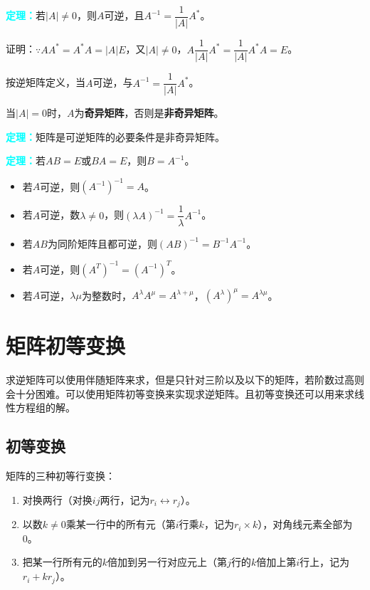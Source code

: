 \documentclass[UTF8, 12pt]{ctexart}
\begin{document}
\textcolor{aqua}{\textbf{定理：}}若$\vert A\vert\neq 0$，则$A$可逆，且$A^{-1}=\dfrac{1}{\vert A\vert}A^*$。

证明：$\because AA^*=A^*A=\vert A\vert E$，又$\vert A\vert\neq 0$，$A\dfrac{1}{\vert A\vert}A^*=\dfrac{1}{\vert A\vert}A^*A=E$。

按逆矩阵定义，当$A$可逆，与$A^{-1}=\dfrac{1}{\vert A\vert}A^*$。

当$\vert A\vert=0$时，$A$为\textbf{奇异矩阵}，否则是\textbf{非奇异矩阵}。

\textcolor{aqua}{\textbf{定理：}}矩阵是可逆矩阵的必要条件是非奇异矩阵。

\textcolor{aqua}{\textbf{定理：}}若$AB=E$或$BA=E$，则$B=A^{-1}$。

\begin{itemize}
    \item 若$A$可逆，则$(A^{-1})^{-1}=A$。
    \item 若$A$可逆，数$\lambda\neq0$，则$(\lambda A)^{-1}=\dfrac{1}{\lambda}A^{-1}$。
    \item 若$AB$为同阶矩阵且都可逆，则$(AB)^{-1}=B^{-1}A^{-1}$。
    \item 若$A$可逆，则$(A^T)^{-1}=(A^{-1})^T$。
    \item 若$A$可逆，$\lambda\mu$为整数时，$A^\lambda A^\mu=A^{\lambda+\mu}$，$(A^\lambda)^\mu=A^{\lambda\mu}$。
\end{itemize}

\section{矩阵初等变换}

求逆矩阵可以使用伴随矩阵来求，但是只针对三阶以及以下的矩阵，若阶数过高则会十分困难。可以使用矩阵初等变换来实现求逆矩阵。且初等变换还可以用来求线性方程组的解。

\subsection{初等变换}

矩阵的三种初等行变换：

\begin{enumerate}
    \item 对换两行（对换$ij$两行，记为$r_i\leftrightarrow r_j$）。
    \item 以数$k\neq0$乘某一行中的所有元（第$i$行乘$k$，记为$r_i\times k$），对角线元素全部为0。
    \item 把某一行所有元的$k$倍加到另一行对应元上（第$j$行的$k$倍加上第$i$行上，记为$r_i+kr_j$）。
\end{enumerate}
\end{document}
